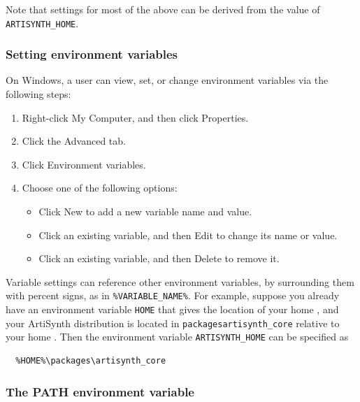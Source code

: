 
Note that settings for most of the above can be derived from the value
of {\tt ARTISYNTH\_HOME}.

\ifWindows
\subsubsection{Setting environment variables}
\label{settingWindowsVariables}

On Windows, a user can view, set, or change environment variables via
the following steps:

\begin{enumerate}

\item Right-click {\sf My Computer}, and then click {\sf Properties}.
\item Click the {\sf Advanced} tab.
\item Click {\sf Environment variables}.
\item Choose one of the following options:

\begin{itemize}

\item Click {\sf New} to add a new variable name and value.
\item Click an existing variable, and then {\sf Edit} to change its name or value.
\item Click an existing variable, and then {\sf Delete} to remove it.

\end{itemize}
\end{enumerate}

Variable settings can reference other environment variables, by
surrounding them with percent signs, as in {\tt \%VARIABLE\_NAME\%}.  For
example, suppose you already have an environment variable {\tt HOME} that
gives the location of your home \directory, and your ArtiSynth
distribution is located in {\tt packages\SEP artisynth\_core} relative to your
home \directory. Then the environment variable {\tt ARTISYNTH\_HOME} can be
specified as

\begin{verbatim}
  %HOME%\packages\artisynth_core
\end{verbatim}

\subsubsection{The PATH environment variable}
\label{settingWindowsPath}

